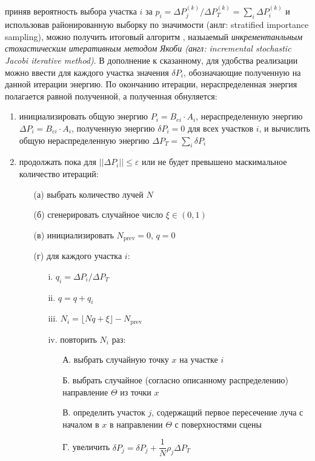 \documentclass[12pt]{article}
\begin{document}
приняв вероятность выбора участка $i$ за $p_i = \Delta P_j^{(k)} / \Delta P_T^{(k)} = \sum\limits_i \Delta P_i^{(k)}$ и  использовав районированную выборку по значимости (анлг: stratified importance sampling), можно получить итоговый алгоритм \cite{Bek99}, назыаемый \emph{инкрементанльным стохастическим итеративным методом Якоби (англ: incremental stochastic Jacobi iterative method)}. В дополнение к сказанному, для удобства реализации можно ввести для каждого участка значения $\delta P_i$, обозначающие полученную на данной итерации энергию. По окончанию итерации, нераспределенная энергия полагается равной полученной, а полученная обнуляется:
\begin{framed}
\begin{enumerate}
\item инициализировать общую энергию $P_i = B_{ei} \cdot A_i$, нераспределенную энергию $\Delta P_i = B_{ei} \cdot A_i$, полученную энергию $\delta P_i = 0$ для всех участков $i$, и вычислить общую нераспределенную энергию $\Delta P_T = \sum\limits_i \delta P_i$
\item продолжать пока для $||\Delta P_i|| \leqslant \varepsilon$ или не будет превышено маскимальное количество итераций:
\begin{enumerate}
    \item[(а)] выбрать количество лучей $N$
    \item[(б)] сгенерировать случайное число $\xi \in (0, 1)$
    \item[(в)] инициализировать $N_{\text{prev}} = 0$, $q = 0$
    \item[(г)] для каждого участка $i$:
    \begin{enumerate}
        \item[i.] $q_i = \Delta P_i / \Delta P_T$
        \item[ii.] $q = q + q_i$
        \item[iii.] $N_i = \lfloor Nq + \xi \rfloor - N_{\text{prev}}$
        \item[iv.] повторить $N_i$ раз:
        \begin{enumerate}
            \item[А.] выбрать случайную точку $x$ на участке $i$
            \item[Б.] выбрать случайное (согласно описанному распределению) направление $\Theta$ из точки $x$
            \item[В.] определить участок $j$, содержащий первое пересечение луча с началом в $x$ в направлении $\Theta$ с поверхностями сцены
            \item[Г.] увеличить $\delta P_j = \delta P_j + \dfrac{1}{N} \rho_j \Delta P_T$

\end{enumerate}
\end{enumerate}
\end{enumerate}
\end{enumerate}
\end{framed}
\end{document}
